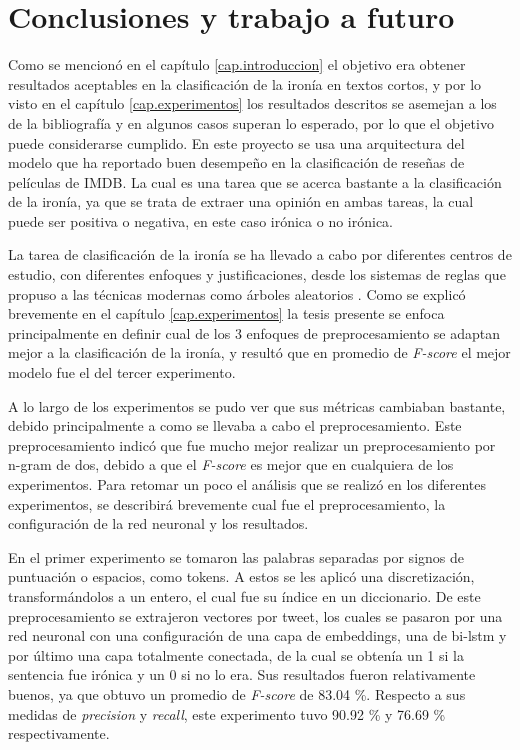 
\chapter{Conclusiones y trabajo a futuro}\label{cap.conclusiones}

\par Como se mencionó en el capítulo \ref{cap.introduccion} el objetivo era obtener resultados aceptables en la clasificación de la ironía en textos cortos, y por lo visto en el capítulo \ref{cap.experimentos} los resultados descritos se asemejan a los de la bibliografía y en algunos casos superan lo esperado, por lo que el objetivo puede considerarse cumplido. En este proyecto se usa una arquitectura del modelo que ha reportado buen desempeño en la clasificación de reseñas de películas de IMDB. La cual es una tarea que se acerca bastante a la clasificación de la ironía, ya que se trata de extraer una opinión en ambas tareas, la cual puede ser positiva o negativa, en este caso irónica o no irónica.


\begin{table}[H]
	\centering
	
	\label{tab:total2}
\end{table}


\par La tarea de clasificación  de la ironía se ha llevado a cabo por diferentes centros de estudio, con diferentes enfoques y justificaciones, desde los sistemas de reglas que propuso \textcite{utsumi1996unified} a las técnicas modernas como árboles aleatorios \textcite{lopez2016character}. Como se explicó brevemente en el capítulo \ref{cap.experimentos} la tesis presente se enfoca principalmente en definir cual de los 3 enfoques de preprocesamiento se adaptan mejor a la clasificación de la ironía, y resultó que en promedio de \textit{F-score} el mejor modelo fue el del tercer experimento. 

\par A lo largo de los experimentos se pudo ver que sus métricas cambiaban bastante, debido principalmente a como se llevaba a cabo el preprocesamiento. Este preprocesamiento indicó que fue mucho mejor realizar un preprocesamiento por n-gram de dos, debido a que el \textit{F-score} es mejor que en cualquiera de los experimentos. Para retomar un poco el análisis que se realizó en los diferentes experimentos, se describirá brevemente cual fue el preprocesamiento, la configuración de la red neuronal y los resultados.

\par En el primer experimento se tomaron las palabras separadas por signos de puntuación o espacios, como tokens. A estos se les aplicó una discretización, transformándolos a un entero, el cual fue su índice en un diccionario. De este preprocesamiento se extrajeron vectores por tweet, los cuales se pasaron por una red neuronal con una configuración de una capa de embeddings, una de \gls{bi-lstm} y por último una capa totalmente conectada, de la cual se obtenía un 1 si la sentencia fue irónica y un 0 si no lo era. Sus resultados fueron relativamente buenos, ya que obtuvo un promedio de \textit{F-score} de 83.04 \%. Respecto a sus medidas de \textit{precision} y \textit{recall}, este experimento tuvo 90.92 \% y 76.69 \% respectivamente.

